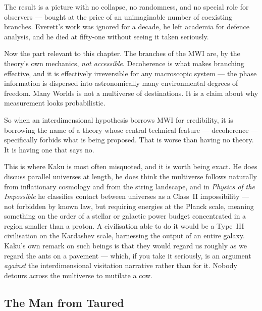 The result is a picture with no collapse, no randomness, and no special role for observers ---
bought at the price of an unimaginable number of coexisting branches. Everett's work was ignored
for a decade, he left academia for defence analysis, and he died at fifty-one without seeing it
taken seriously.

Now the part relevant to this chapter. The branches of the MWI are, by the theory's own
mechanics, \emph{not accessible}. Decoherence is what makes branching effective, and it is
effectively irreversible for any macroscopic system --- the phase information is dispersed into
astronomically many environmental degrees of freedom. 
Many Worlds is not a multiverse of destinations. It is a claim about why measurement looks
probabilistic.

So when an interdimensional hypothesis borrows MWI for credibility, it is borrowing the name of
a theory whose central technical feature --- decoherence --- specifically forbids what is being
proposed. That is worse than having no theory. It is having one that says no.

This is where Kaku is most often misquoted, and it is worth being exact. He does discuss parallel
universes at length, he does think the multiverse follows naturally from inflationary cosmology
and from the string landscape, and in \emph{Physics of the Impossible} he classifies contact
between universes as a Class~II impossibility --- not forbidden by known law, but requiring
energies at the Planck scale, meaning something on the order of a stellar or galactic power
budget concentrated in a region smaller than a proton. 
A civilisation able to do it would be a Type~III civilisation on the Kardashev scale, harnessing
the output of an entire galaxy. Kaku's own remark on such beings is that they would regard us
roughly as we regard the ants on a pavement --- which, if you take it seriously, is an argument
\emph{against} the interdimensional visitation narrative rather than for it. Nobody detours across
the multiverse to mutilate a cow.

\subsection{The Man from Taured}

